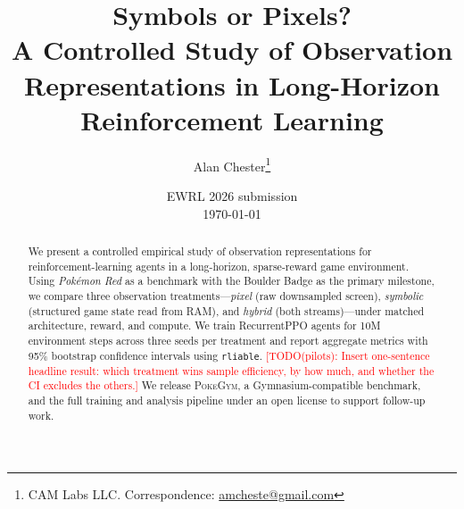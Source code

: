 \documentclass[11pt,a4paper]{article}
\title{%
  Symbols or Pixels? \\
  \Large A Controlled Study of Observation Representations in Long-Horizon
  Reinforcement Learning
}
\author{%
  Alan Chester\thanks{CAM Labs LLC. Correspondence:
    \href{mailto:amcheste@gmail.com}{amcheste@gmail.com}}
}
\date{%
  EWRL 2026 submission \\[2pt]
  \small\today
}
\newcommand{\todopilot}[1]{\textcolor{red}{[TODO(pilots): #1]}}
\begin{document}
\maketitle

\begin{abstract}
We present a controlled empirical study of observation representations
for reinforcement-learning agents in a long-horizon, sparse-reward game
environment.  Using \emph{Pokémon Red} as a benchmark with the Boulder
Badge as the primary milestone, we compare three observation
treatments---\emph{pixel} (raw downsampled screen), \emph{symbolic}
(structured game state read from RAM), and \emph{hybrid} (both
streams)---under matched architecture, reward, and compute.
%
We train RecurrentPPO agents for 10M environment steps across three
seeds per treatment and report aggregate metrics with 95\% bootstrap
confidence intervals using \texttt{rliable}.
%
\todopilot{Insert one-sentence headline result: which treatment wins
sample efficiency, by how much, and whether the CI excludes the others.}
%
We release \textsc{PokeGym}, a Gymnasium-compatible benchmark, and the
full training and analysis pipeline under an open license to support
follow-up work.
\end{abstract}










\end{document}
